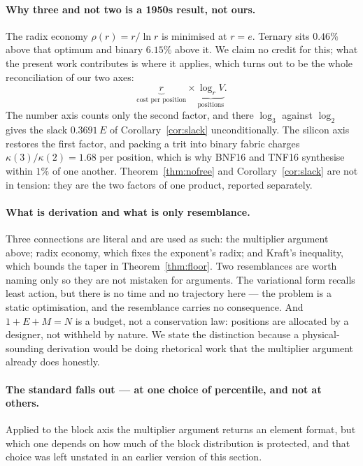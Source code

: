 \documentclass[11pt]{article}
\theoremstyle{definition}
\begin{document}
\paragraph{Why three and not two is a 1950s result, not ours.} The radix economy
$\rho(r) = r/\ln r$ is minimised at $r = e$. Ternary sits $0.46\%$ above that
optimum and binary $6.15\%$ above it. We claim no credit for this; what the present
work contributes is where it applies, which turns out to be the whole
reconciliation of our two axes:
\[
  \underbrace{r}_{\text{cost per position}} \times \underbrace{\log_r V}_{\text{positions}} .
\]
The number axis counts only the second factor, and there $\log_3$ against $\log_2$
gives the slack $0.3691\,E$ of Corollary~\ref{cor:slack} unconditionally. The
silicon axis restores the first factor, and packing a trit into binary fabric
charges $\kappa(3)/\kappa(2) = 1.68$ per position, which is why BNF16 and TNF16
synthesise within $1\%$ of one another. Theorem~\ref{thm:nofree} and
Corollary~\ref{cor:slack} are not in tension: they are the two factors of one
product, reported separately.

\paragraph{What is derivation and what is only resemblance.} Three connections are
literal and are used as such: the multiplier argument above; radix economy, which
fixes the exponent's radix; and Kraft's inequality, which bounds the taper in
Theorem~\ref{thm:floor}. Two resemblances are worth naming only so they are not
mistaken for arguments. The variational form recalls least action, but there is no
time and no trajectory here --- the problem is a static optimisation, and the
resemblance carries no consequence. And $1+E+M=N$ is a budget, not a conservation
law: positions are allocated by a designer, not withheld by nature. We state the
distinction because a physical-sounding derivation would be doing rhetorical work
that the multiplier argument already does honestly.

\paragraph{The standard falls out --- at one choice of percentile, and not at
others.} Applied to the block axis the multiplier argument returns an element
format, but which one depends on how much of the block distribution is protected,
and that choice was left unstated in an earlier version of this section.
\end{document}
